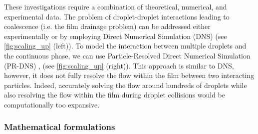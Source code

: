 These investigations require a combination of theoretical, numerical, and experimental data. 
The problem of droplet-droplet interactions leading to coalescence (i.e. the film drainage problem) can be addressed either experimentally or by employing Direct Numerical Simulation (DNS)  (see \ref{fig:scaling_up} (left)).
To model the interaction between multiple droplets and the continuous phase, we can use Particle-Resolved Direct Numerical Simulation (PR-DNS) \citep{tryggvason2006direct}, (see \ref{fig:scaling_up} (right)).
This approach is similar to DNS, however, it does not fully resolve the flow within the film between two interacting particles.
Indeed, accurately solving the flow around hundreds of droplets while also resolving the flow within the film during droplet collisions would be computationally too expansive.




\subsubsection{Mathematical formulations}

